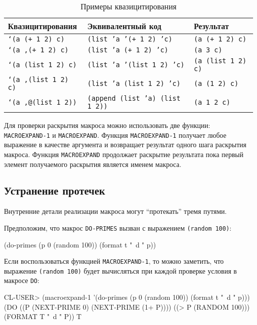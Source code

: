 \begin{table}[h!]
  \caption{Примеры квазицитирования}
  \begin{center}
    \begin{tabular}{lll}
      \toprule
      Квазицитирования & Эквивалентный код & Результат \\
      \midrule
      \texttt{`(a (+ 1 2) c)} & \texttt{(list 'a '(+ 1 2) 'c)} & \texttt{(a (+ 1 2) c)} \\
      \texttt{`(a ,(+ 1 2) c)} & \texttt{(list 'a (+ 1 2) 'c)} & \texttt{(a 3 c)} \\
      \texttt{`(a (list 1 2) c)} & \texttt{(list 'a '(list 1 2) 'c)} & \texttt{(a (list 1 2) c)} \\
      \texttt{`(a ,(list 1 2) c)} & \texttt{(list 'a (list 1 2) 'c)} & \texttt{(a (1 2) c)} \\
      \texttt{`(a ,@(list 1 2))} & \texttt{(append (list 'a) (list 1 2))} & \texttt{(a 1 2 c)} \\
      \bottomrule
    \end{tabular}
  \end{center}
\end{table}

Для проверки раскрытия макроса можно использовать две функции: \lstinline{MACROEXPAND-1} и \lstinline{MACROEXPAND}. Функция \lstinline{MACROEXPAND-1} получает любое выражение в качестве аргумента и возвращает результат одного шага раскрытия макроса. Функция \lstinline{MACROEXPAND} продолжает раскрытие результата пока первый элемент получаемого раскрытия является именем макроса.

\subsection{Устранение протечек}
Внутренние детали реализации макроса могут ``протекать'' тремя путями.

Предположим, что макрос \lstinline{DO-PRIMES} вызван с выражением \lstinline{(random 100)}:
\begin{cllst}{}{}
(do-primes (p 0 (random 100))
  (format t "~d " p))
\end{cllst}

Если воспользоваться функцией \lstinline{MACROEXPAND-1}, то можно заметить, что выражение \lstinline{(random 100)} будет вычисляться при каждой проверке условия в макросе \lstinline{DO}:
\begin{cllst}{}{}
CL-USER> (macroexpand-1 '(do-primes (p 0 (random 100)) (format t "~d " p)))
(DO ((P (NEXT-PRIME 0) (NEXT-PRIME (1+ P))))
    ((> P (RANDOM 100)))
  (FORMAT T "~d " P))
T
\end{cllst}

